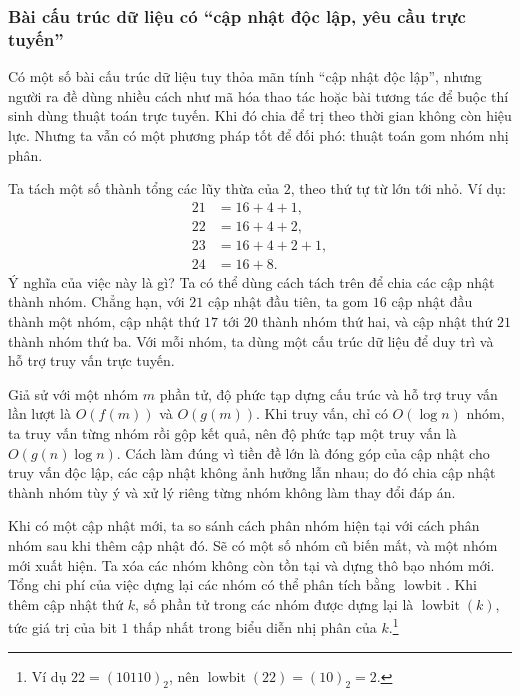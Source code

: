 \documentclass[11pt]{article}
\begin{document}
\subsubsection{Bài cấu trúc dữ liệu có ``cập nhật độc lập, yêu cầu trực
tuyến''}

Có một số bài cấu trúc dữ liệu tuy thỏa mãn tính ``cập nhật độc lập'', nhưng
người ra đề dùng nhiều cách như mã hóa thao tác hoặc bài tương tác để buộc
thí sinh dùng thuật toán trực tuyến. Khi đó chia để trị theo thời gian không
còn hiệu lực. Nhưng ta vẫn có một phương pháp tốt để đối phó: thuật toán gom
nhóm nhị phân.

Ta tách một số thành tổng các lũy thừa của \(2\), theo thứ tự từ lớn tới nhỏ.
Ví dụ:
\[
\begin{aligned}
21 &= 16+4+1,\\
22 &= 16+4+2,\\
23 &= 16+4+2+1,\\
24 &= 16+8.
\end{aligned}
\]
Ý nghĩa của việc này là gì? Ta có thể dùng cách tách trên để chia các cập
nhật thành nhóm. Chẳng hạn, với \(21\) cập nhật đầu tiên, ta gom \(16\) cập
nhật đầu thành một nhóm, cập nhật thứ \(17\) tới \(20\) thành nhóm thứ hai,
và cập nhật thứ \(21\) thành nhóm thứ ba. Với mỗi nhóm, ta dùng một cấu trúc
dữ liệu để duy trì và hỗ trợ truy vấn trực tuyến.

Giả sử với một nhóm \(m\) phần tử, độ phức tạp dựng cấu trúc và hỗ trợ truy
vấn lần lượt là \(O(f(m))\) và \(O(g(m))\). Khi truy vấn, chỉ có
\(O(\log n)\) nhóm, ta truy vấn từng nhóm rồi gộp kết quả, nên độ phức tạp
một truy vấn là \(O(g(n)\log n)\). Cách làm đúng vì tiền đề lớn là đóng góp
của cập nhật cho truy vấn độc lập, các cập nhật không ảnh hưởng lẫn nhau; do
đó chia cập nhật thành nhóm tùy ý và xử lý riêng từng nhóm không làm thay
đổi đáp án.

Khi có một cập nhật mới, ta so sánh cách phân nhóm hiện tại với cách phân
nhóm sau khi thêm cập nhật đó. Sẽ có một số nhóm cũ biến mất, và một nhóm
mới xuất hiện. Ta xóa các nhóm không còn tồn tại và dựng thô bạo nhóm mới.
Tổng chi phí của việc dựng lại các nhóm có thể phân tích bằng \(\operatorname{lowbit}\).
Khi thêm cập nhật thứ \(k\), số phần tử trong các nhóm được dựng lại là
\(\operatorname{lowbit}(k)\), tức giá trị của bit \(1\) thấp nhất trong biểu
diễn nhị phân của \(k\).\footnote{Ví dụ
\(22=(10110)_2\), nên \(\operatorname{lowbit}(22)=(10)_2=2\).}
\end{document}
